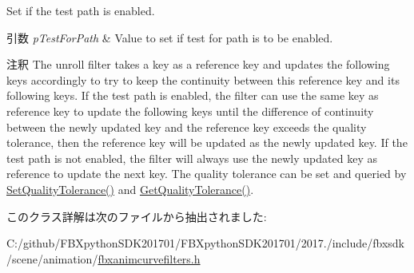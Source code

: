 Set if the test path is enabled. 
\begin{DoxyParams}{引数}
{\em p\+Test\+For\+Path} & Value to set if test for path is to be enabled. \\
\hline
\end{DoxyParams}
\begin{DoxyRemark}{注釈}
The unroll filter takes a key as a reference key and updates the following keys accordingly to try to keep the continuity between this reference key and its following keys. If the test path is enabled, the filter can use the same key as reference key to update the following keys until the difference of continuity between the newly updated key and the reference key exceeds the quality tolerance, then the reference key will be updated as the newly updated key. If the test path is not enabled, the filter will always use the newly updated key as reference to update the next key. The quality tolerance can be set and queried by \hyperlink{class_fbx_anim_curve_filter_unroll_ad8570bf12f5c397fb975fe961aeed29f}{Set\+Quality\+Tolerance()} and \hyperlink{class_fbx_anim_curve_filter_unroll_a881a4c7122073deec59ab208b2bdf95a}{Get\+Quality\+Tolerance()}. 
\end{DoxyRemark}


このクラス詳解は次のファイルから抽出されました\+:\begin{DoxyCompactItemize}
\item 
C\+:/github/\+F\+B\+Xpython\+S\+D\+K201701/\+F\+B\+Xpython\+S\+D\+K201701/2017./include/fbxsdk/scene/animation/\hyperlink{fbxanimcurvefilters_8h}{fbxanimcurvefilters.\+h}\end{DoxyCompactItemize}
